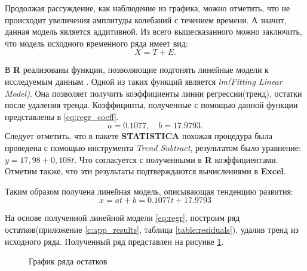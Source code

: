 Продолжая рассуждение, как наблюдение из графика, можно отметить, что не происходит увеличения амплитуды колебаний с течением времени. А значит, данная модель является аддитивной. Из всего вышесказанного можно заключить, что модель исходного временного ряда имеет вид:
\begin{equation*}
	X = T + E.
\end{equation*}

В \textbf{R} реализованы функции, позволяющие подгонять линейные модели к исследуемым данным \cite{Shumway2006Time}. Одной из таких функций является \textit{lm(Fitting Linear Model)}. Она позволяет получить коэффициенты линии регрессии(тренд), остатки после удаления тренда. Коэффицинты, полученные с помощью данной функции представлены в \eqref{eq:regr_coeff}.
\begin{equation}
\label{eq:regr_coeff}
	a = 0.1077, \quad b = 17.9793.
\end{equation}
Следует отметить, что в пакете \textbf{STATISTICA} похожая процедура была проведена с помощью инструмента \textit{Trend Subtract}, результатом было уравнение: $y=17,98+0,108t$. Что согласуется с полученными в \textbf{R} коэффициентами. Отметим также, что эти результаты подтверждаются вычислениями в \textbf{Excel}.

Таким образом получена линейная модель, описывающая тенденцию развития:
\begin{equation}
\label{eq:regr}
	x = at + b = 0.1077t + 17.9793
\end{equation}

На основе полученной линейной модели \eqref{eq:regr}, построим ряд остатков(приложение \ref{c:app_results}, таблица \ref{table:residuals}), удалив тренд из исходного ряда. Полученный ряд представлен на рисунке \ref{img:ts_detrended}.
\begin{figure}[ht]
\caption{График ряда остатков}
\label{img:ts_detrended}
\end{figure}

